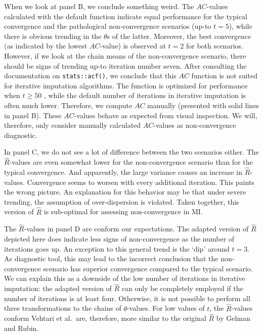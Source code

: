\documentclass[Royal,times,sageh]{sagej}
\begin{document}
When we look at panel B, we conclude something weird. The \(AC\)-values calculated with the default function indicate equal performance for the typical convergence and the pathological non-convergence scenarios (up-to \(t=5\)), while there is obvious trending in the \(\theta\)s of the latter. Moreover, the best convergence (as indicated by the lowest \(AC\)-value) is observed at \(t=2\) for both scenarios. However, if we look at the chain means of the non-convergence scenario, there should be signs of trending up-to iteration number seven. After consulting the documentation on \texttt{stats::acf()}, we conclude that this \(AC\) function is not suited for iterative imputation algorithms. The function is optimized for performance when \(t\geq50\) \citep{box15}, while the default number of iterations in iterative imputation is often much lower. Therefore, we compute \(AC\) manually (presented with solid lines in panel B). These \(AC\)-values behave as expected from visual inspection. We will, therefore, only consider manually calculated \(AC\)-values as non-convergence diagnostic.

In panel C, we do not see a lot of difference between the two scenarios either. The \(\widehat{R}\)-values are even somewhat lower for the non-convergence scenario than for the typical convergence. And apparently, the large variance causes an increase in \(\widehat{R}\)-values. Convergence seems to worsen with every additional iteration. This paints the wrong picture. An explanation for this behavior may be that under severe trending, the assumption of over-dispersion is violated. Taken together, this version of \(\widehat{R}\) is sub-optimal for assessing non-convergence in MI.

The \(\widehat{R}\)-values in panel D are conform our expectations. The adapted version of \(\widehat{R}\) depicted here does indicate less signs of non-convergence as the number of iterations goes up. An exception to this general trend is the `dip' around \(t=3\). As diagnostic tool, this may lead to the incorrect conclusion that the non-convergence scenario has superior convergence compared to the typical scenario. We can explain this as a downside of the low number of iterations in iterative imputation: the adapted version of \(\widehat{R}\) can only be completely employed if the number of iterations is at least four. Otherwise, it is not possible to perform all three transformations to the chains of \(\theta\)-values. For low values of \(t\), the \(\widehat{R}\)-values conform Vehtari et al.~are, therefore, more similar to the original \(\widehat{R}\) by Gelman and Rubin.
\end{document}
